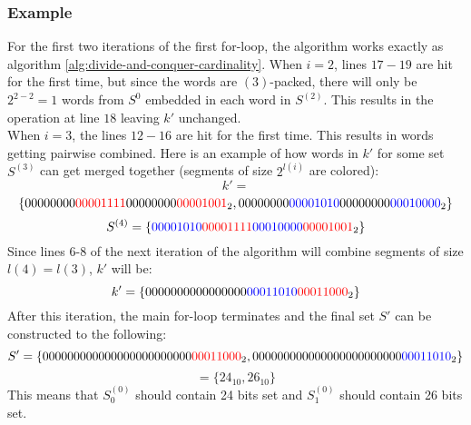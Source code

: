 \subsubsection{Example}
For the first two iterations of the first for-loop, the algorithm works exactly as algorithm \ref{alg:divide-and-conquer-cardinality}. When $i=2$, lines $17-19$ are hit for the first time, but since the words are $(3)$-packed, there will only be $2^{2-2}=1$ words from $S^{0}$ embedded in each word in $S^{(2)}$. This results in the operation at line $18$ leaving $k'$ unchanged.\\
When $i=3$, the lines $12-16$ are hit for the first time. This results in words getting pairwise combined. Here is an example of how words in $k'$ for some set $S^{(3)}$ can get merged together (segments of size $2^{l(i)}$ are colored):
$$k'=$$
$$\{00000000 \color{red}00001111 \color{black}00000000 \color{red}00001001\color{black}_2, \color{black}0000 0000 \color{blue}0000 1010\color{black}00000000\color{blue}00010000\color{black}_2\}$$
$$S^{(4)}=\{\color{blue}00001010\color{red}00001111\color{blue}0001 0000 \color{red}0000 1001\color{black}_2\}$$
Since lines 6-8 of the next iteration of the algorithm will combine segments of size $l(4) = l(3)$, $k'$ will be:
$$k'=\{\color{black}0000000000000000\color{blue}0001 1010 \color{red}0001 1000\color{black}_2\}$$
After this iteration, the main for-loop terminates and the final set $S'$ can be constructed to the following:
$$S'=\{0000000000000000 00000000 \color{red}00011000\color{black}_2, 0000000000000000 0000 0000 \color{blue} 0001 1010\color{black}_2\}$$
$$=\{ 24_{10}, 26_{10} \}$$
This means that $S^{(0)}_0$ should contain 24 bits set and $S^{(0)}_1$ should contain 26 bits set.
